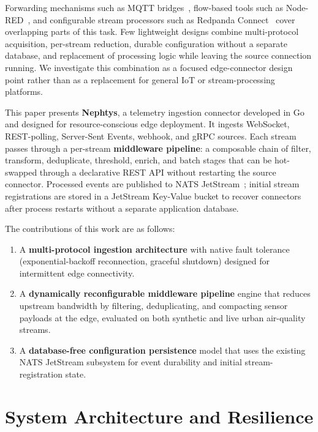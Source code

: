\documentclass[conference]{IEEEtran}
\begin{document}
Forwarding mechanisms such as MQTT bridges~\cite{mqtt2019}, flow-based tools such as Node-RED~\cite{nodered2026}, and configurable stream processors such as Redpanda Connect~\cite{redpandaconnect2026} cover overlapping parts of this task. Few lightweight designs combine multi-protocol acquisition, per-stream reduction, durable configuration without a separate database, and replacement of processing logic while leaving the source connection running. We investigate this combination as a focused edge-connector design point rather than as a replacement for general IoT or stream-processing platforms.

This paper presents \textbf{Nephtys}, a telemetry ingestion connector developed in Go~\cite{go2026} and designed for resource-conscious edge deployment. It ingests WebSocket, REST-polling, Server-Sent Events, webhook, and gRPC sources. Each stream passes through a per-stream \textbf{middleware pipeline}: a composable chain of filter, transform, deduplicate, threshold, enrich, and batch stages that can be hot-swapped through a declarative REST API without restarting the source connector. Processed events are published to NATS JetStream~\cite{nats2026}; initial stream registrations are stored in a JetStream Key-Value bucket to recover connectors after process restarts without a separate application database.

The contributions of this work are as follows:
\begin{enumerate}
  \item A \textbf{multi-protocol ingestion architecture} with native fault tolerance (exponential-backoff reconnection, graceful shutdown) designed for intermittent edge connectivity.
  \item A \textbf{dynamically reconfigurable middleware pipeline} engine that reduces upstream bandwidth by filtering, deduplicating, and compacting sensor payloads at the edge, evaluated on both synthetic and live urban air-quality streams.
  \item A \textbf{database-free configuration persistence} model that uses the existing NATS JetStream subsystem for event durability and initial stream-registration state.
\end{enumerate}

\section{System Architecture and Resilience}
\end{document}
